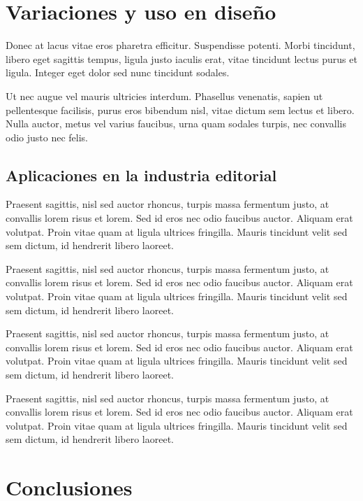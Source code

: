 \section{Variaciones y uso en diseño}

Donec at lacus vitae eros pharetra efficitur. Suspendisse potenti. Morbi tincidunt, libero eget sagittis tempus, ligula justo iaculis erat, vitae tincidunt lectus purus et ligula. Integer eget dolor sed nunc tincidunt sodales.

Ut nec augue vel mauris ultricies interdum. Phasellus venenatis, sapien ut pellentesque facilisis, purus eros bibendum nisl, vitae dictum sem lectus et libero. Nulla auctor, metus vel varius faucibus, urna quam sodales turpis, nec convallis odio justo nec felis.

\subsection{Aplicaciones en la industria editorial}

Praesent sagittis, nisl sed auctor rhoncus, turpis massa fermentum justo, at convallis lorem risus et lorem. Sed id eros nec odio faucibus auctor. Aliquam erat volutpat. Proin vitae quam at ligula ultrices fringilla. Mauris tincidunt velit sed sem dictum, id hendrerit libero laoreet.

Praesent sagittis, nisl sed auctor rhoncus, turpis massa fermentum justo, at convallis lorem risus et lorem. Sed id eros nec odio faucibus auctor. Aliquam erat volutpat. Proin vitae quam at ligula ultrices fringilla. Mauris tincidunt velit sed sem dictum, id hendrerit libero laoreet.

Praesent sagittis, nisl sed auctor rhoncus, turpis massa fermentum justo, at convallis lorem risus et lorem. Sed id eros nec odio faucibus auctor. Aliquam erat volutpat. Proin vitae quam at ligula ultrices fringilla. Mauris tincidunt velit sed sem dictum, id hendrerit libero laoreet.

Praesent sagittis, nisl sed auctor rhoncus, turpis massa fermentum justo, at convallis lorem risus et lorem. Sed id eros nec odio faucibus auctor. Aliquam erat volutpat. Proin vitae quam at ligula ultrices fringilla. Mauris tincidunt velit sed sem dictum, id hendrerit libero laoreet.

\section{Conclusiones}

